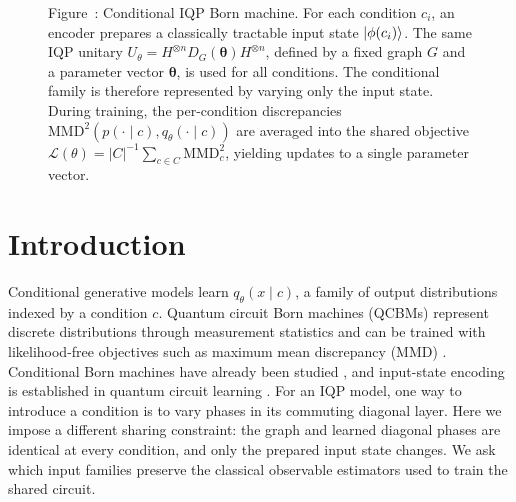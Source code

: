 \documentclass[pra,aps,10pt,twocolumn,floatfix,superscriptaddress,
notitlepage,longbibliography]{revtex4-2}
\newcommand{\widefigurecaption}[2]{%
  \refstepcounter{figure}\label{#2}%
  \par\vspace{6pt}
  \noindent\parbox{\linewidth}{\small Figure~\thefigure: #1}\par}
\begin{document}
\begin{figure}[t]
\begin{minipage}{\textwidth}
{%
}

\widefigurecaption{Conditional IQP Born machine. For each condition $c_i$, an encoder prepares a classically tractable input state $\ket{\phi(c_i)}$. The same IQP unitary $U_{\theta}=H^{\otimes n}D_G(\boldsymbol\theta)H^{\otimes n}$, defined by a fixed graph $G$ and a parameter vector $\boldsymbol\theta$, is used for all conditions. The conditional family is therefore represented by varying only the input state. During training, the per-condition discrepancies $\mathrm{MMD}^2\!\left(p(\cdot\mid c), q_\theta(\cdot\mid c) \right)$ are averaged into the shared objective $\mathcal L(\theta) = |C|^{-1} \sum_{c\in C} \mathrm{MMD}^2_c$, yielding updates to a single parameter vector. }{fig:pipeline_workflow}
\end{minipage}
\end{figure}
\section{Introduction}

Conditional generative models learn $q_\theta(x\mid c)$, a family of output distributions indexed by a condition $c$. Quantum circuit Born machines (QCBMs) represent discrete distributions through measurement statistics and can be trained with likelihood-free objectives such as maximum mean discrepancy (MMD) \cite{liuDifferentiableLearning2018,benedettiGenerativeModeling2019,gaoQuantumGenerativeModels2018}. Conditional Born machines have already been studied \cite{kissConditionalBornMachine2022,zengConditionalQCBM2023}, and input-state encoding is established in quantum circuit learning \cite{mitaraiQuantumCircuitLearning2018,schuldEffectDataEncoding2021,casasMultidimensionalFourier2023}. For an IQP model, one way to introduce a condition is to vary phases in its commuting diagonal layer. Here we impose a different sharing constraint: the graph and learned diagonal phases are identical at every condition, and only the prepared input state changes. We ask which input families preserve the classical observable estimators used to train the shared circuit.
\end{document}
